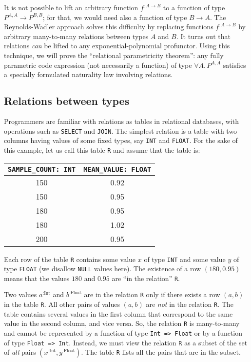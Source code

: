 It is not possible to lift an arbitrary function $f^{:A\rightarrow B}$
to a function of type $P^{A,A}\rightarrow P^{B,B}$; for that, we
would need also a function of type $B\rightarrow A$. The Reynolds-Wadler
approach solves this difficulty by replacing functions $f^{:A\rightarrow B}$
by arbitrary many-to-many relations between types $A$ and $B$. It
turns out that relations \emph{can} be lifted to any exponential-polynomial
profunctor. Using this technique, we will prove the \textsf{``}relational
parametricity theorem\textsf{''}: any fully parametric code expression (not
necessarily a function) of type $\forall A.\,P^{A,A}$ satisfies a
specially formulated naturality law involving relations.

\subsection{Relations between types}

Programmers are familiar with relations as tables in relational databases,
with operations such as \lstinline!SELECT! and \lstinline!JOIN!.
The simplest relation is a table with two columns having values of
some fixed types, say \lstinline!INT! and \lstinline!FLOAT!. For
the sake of this example, let us call this table \lstinline!R! and
assume that the table is:
\begin{center}
\begin{tabular}{|c|c|}
\hline 
\lstinline!SAMPLE_COUNT: INT! & \lstinline!MEAN_VALUE: FLOAT!\tabularnewline
\hline 
\hline 
{\footnotesize{}150} & {\footnotesize{}0.92}\tabularnewline
\hline 
{\footnotesize{}150} & {\footnotesize{}0.95}\tabularnewline
\hline 
{\footnotesize{}180} & {\footnotesize{}0.95}\tabularnewline
\hline 
{\footnotesize{}180} & {\footnotesize{}1.02}\tabularnewline
\hline 
{\footnotesize{}200} & {\footnotesize{}0.95}\tabularnewline
\hline 
\end{tabular}
\par\end{center}

Each row of the table \lstinline!R! contains some value $x$ of type
\lstinline!INT! and some value $y$ of type \lstinline!FLOAT! (we
disallow \lstinline!NULL! values here). The existence of a row $\left(180,0.95\right)$
means that the values $180$ and $0.95$ are \textsf{``}in the relation\textsf{''}
\lstinline!R!.

Two values $a^{:\text{Int}}$ and $b^{:\text{Float}}$ are in the
relation \lstinline!R! only if there exists a row $\left(a,b\right)$
in the table \lstinline!R!. All other pairs of values $\left(a,b\right)$
are \emph{not} in the relation \lstinline!R!. The table contains
several values in the first column that correspond to the same value
in the second column, and vice versa. So, the relation \lstinline!R!
is many-to-many and cannot be represented by a function of type \lstinline!Int => Float!
or by a function of type \lstinline!Float => Int!. Instead, we must
view the relation \lstinline!R! as a subset of the set of \emph{all}
pairs $(x^{:\text{Int}},y^{:\text{Float}})$. The table \lstinline!R!
lists all the pairs that are in the subset.

